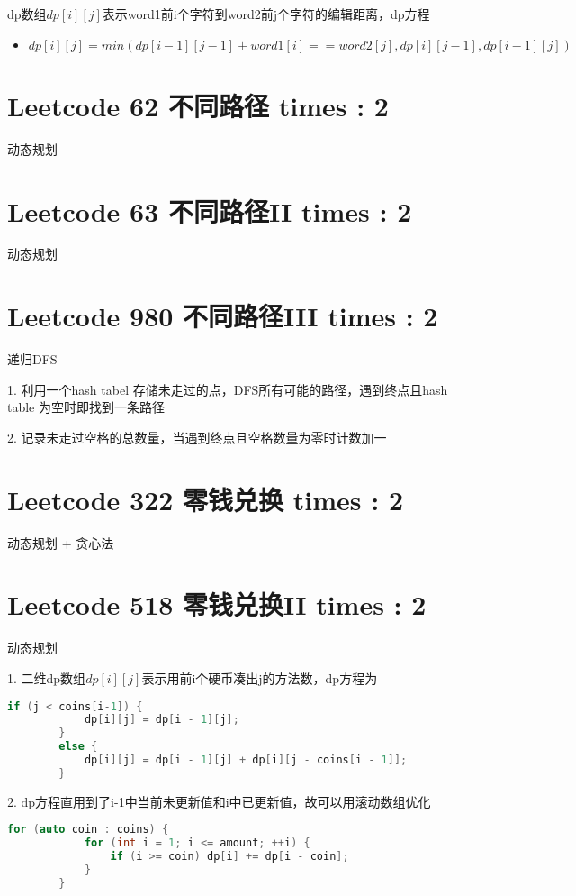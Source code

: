 \documentclass[UTF8]{ctexart}
\begin{document}
dp数组$dp[i][j]$表示word1前i个字符到word2前j个字符的编辑距离，dp方程
\begin{itemize}
	\item $dp[i][j] = min(dp[i - 1][j - 1] + word1[i] == word2[j], dp[i][j - 1], dp[i - 1][j])$
\end{itemize}

\section{Leetcode 62 不同路径 times : 2}
动态规划

\section{Leetcode 63 不同路径II times : 2}
动态规划

\section{Leetcode 980 不同路径III times : 2}
递归DFS

1. 利用一个hash tabel 存储未走过的点，DFS所有可能的路径，遇到终点且hash table 为空时即找到一条路径

2. 记录未走过空格的总数量，当遇到终点且空格数量为零时计数加一

\section{Leetcode 322 零钱兑换 times : 2}
动态规划 + 贪心法

\section{Leetcode 518 零钱兑换II times : 2}
动态规划

1. 二维dp数组$dp[i][j]$表示用前i个硬币凑出j的方法数，dp方程为
\begin{framed}
	\begin{lstlisting}[language=C++]
		if (j < coins[i-1]) {
			dp[i][j] = dp[i - 1][j];
		}
		else {
			dp[i][j] = dp[i - 1][j] + dp[i][j - coins[i - 1]];
		}
	\end{lstlisting}
\end{framed}

2. dp方程直用到了i-1中当前未更新值和i中已更新值，故可以用滚动数组优化
\begin{framed}
	\begin{lstlisting}[language=C++]
		for (auto coin : coins) {
			for (int i = 1; i <= amount; ++i) {
				if (i >= coin) dp[i] += dp[i - coin];
			}
		}
	\end{lstlisting}
\end{framed}
\end{document}
